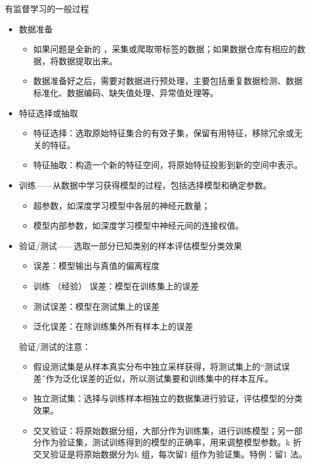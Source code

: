 \textcolor{main1}{有监督学习的一般过程}
\begin{itemize}
    \item 数据准备
    \begin{itemize}
        \item 如果问题是全新的 ，采集或爬取带标签的数据；如果数据仓库有相应的数据，将数据提取出来。
        \item 数据准备好之后，需要对数据进行预处理，主要包括重复数据检测、数据标准化、数据编码、缺失值处理、异常值处理等。
    \end{itemize}
    \item 特征选择或抽取
    \begin{itemize}
        \item 特征选择：选取原始特征集合的有效子集，保留有用特征，移除冗余或无关的特征。
        \item 特征抽取：构造一个新的特征空间，将原始特征投影到新的空间中表示。
    \end{itemize}
    \item 训练——从数据中学习获得模型的过程，包括选择模型和确定参数。
    \begin{itemize}
        \item 超参数，如深度学习模型中各层的神经元数量；
        \item 模型内部参数，如深度学习模型中神经元间的连接权值。
    \end{itemize}
    \item 验证/测试——选取一部分已知类别的样本评估模型分类效果
    \begin{itemize}
        \item 误差：模型输出与真值的偏离程度
        \item 训练 （经验） 误差：模型在训练集上的误差
        \item 测试误差：模型在测试集上的误差
        \item 泛化误差：在除训练集外所有样本上的误差
    \end{itemize}
    \begin{note}
        验证/测试的注意：
        \begin{itemize}
            \item 假设测试集是从样本真实分布中独立采样获得，将测试集上的“测试误差”作为泛化误差的近似，所以测试集要和训练集中的样本互斥。
            \item 独立测试集：选择与训练样本相独立的数据集进行验证，评估模型的分类效果。
            \item 交叉验证：将原始数据分组，大部分作为训练集，进行训练模型；另一部分作为验证集，测试训练得到的模型的正确率，用来调整模型参数。k 折交叉验证是将原始数据分为k 组，每次留1 组作为验证集。特例：留1 法。

\end{itemize}
\end{note}
\end{itemize}
